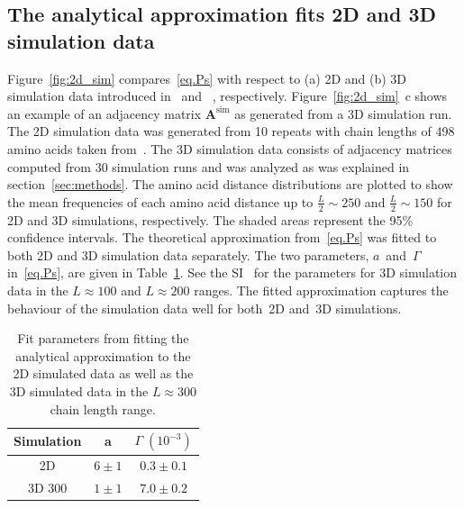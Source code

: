 \documentclass[10pt]{iopart}
\begin{document}
\subsection{The analytical approximation fits 2D and 3D simulation data}
Figure~\ref{fig:2d_sim} compares~\ref{eq.Ps} with respect to (a) 2D and (b) 3D simulation data introduced in~\cite{molkenthin2016scaling} and ~\cite{molkenthin2020self}, respectively. Figure~\ref{fig:2d_sim}~c shows an example of an adjacency matrix $\mathbf{A}^{\mathrm{sim}}$ as generated from a 3D simulation run. The 2D simulation data was generated from 10 repeats with chain lengths of 498 amino acids taken from~\cite{molkenthin2016scaling}. The 3D simulation data consists of adjacency matrices computed from 30 simulation runs and was analyzed as was explained in section~\ref{sec:methods}. The amino acid distance distributions are plotted to show the mean frequencies of each amino acid distance up to $\frac{L}{2}\sim250$ and $\frac{L}{2}\sim150$ for 2D and 3D simulations, respectively. The shaded areas represent the 95\% confidence intervals. The theoretical approximation from~\ref{eq.Ps} was fitted to both 2D and 3D simulation data separately. The two parameters, $a$~and~$\Gamma$ in~\ref{eq.Ps}, are given in Table~\ref{table:sim-results}. See the SI~\cite{SI} for the parameters for 3D simulation data in the $L\approx 100$ and $L \approx 200$ ranges. The fitted approximation captures the behaviour of the simulation data well for both~2D and~3D simulations.

\begin{table}[htb]
\centering
\setlength{\tabcolsep}{25pt}
\begin{tabular}{ccc}
\hline
Simulation & a &$\Gamma\; (10^{-3})$ \\
\hline
2D& $6 \pm 1$ & $0.3 \pm 0.1$ \\
3D 300& $1 \pm 1$ & $7.0 \pm 0.2$ \\
\hline
\end{tabular}%
\caption{Fit parameters from fitting the analytical approximation to the 2D simulated data as well as the 3D simulated data in the $L\approx 300$ chain length range.}
\label{table:sim-results}
\end{table}
\end{document}
